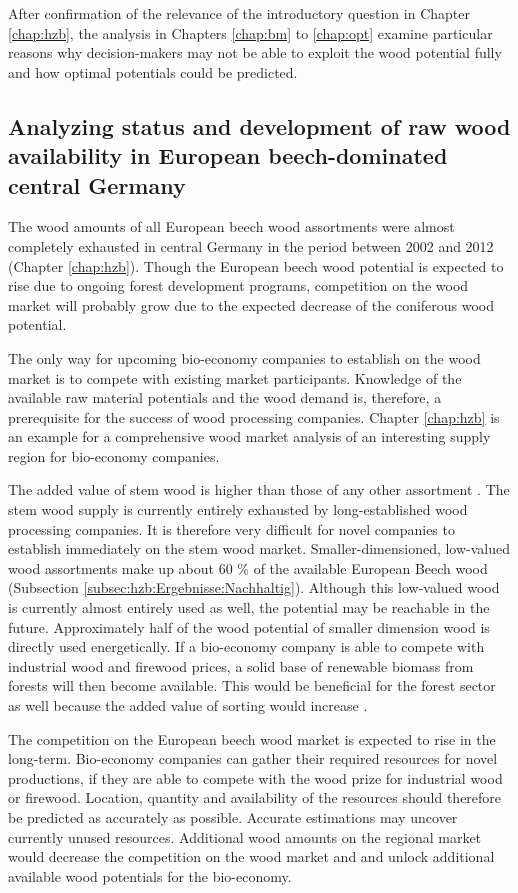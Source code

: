 After confirmation of the relevance of the introductory question in Chapter \ref{chap:hzb}, the analysis in Chapters \ref{chap:bm} to \ref{chap:opt} examine particular reasons why decision-makers may not be able to exploit the wood potential fully and how optimal potentials could be predicted.

\subsection{Analyzing status and development of raw wood availability in European beech-dominated central Germany}
\label{subsec:discussion:struct:hzb}
The wood amounts of all European beech wood assortments were almost completely exhausted in central Germany in the period between 2002 and 2012 (Chapter \ref{chap:hzb}). Though the European beech wood potential is expected to rise due to ongoing forest development programs, competition on the wood market will probably grow due to the expected decrease of the coniferous wood potential.

The only way for upcoming bio-economy companies to establish on the wood market is to compete with existing market participants. Knowledge of the available raw material potentials and the wood demand is, therefore, a prerequisite for the success of wood processing companies. Chapter \ref{chap:hzb} is an example for a comprehensive wood market analysis of an interesting supply region for bio-economy companies.

The added value of stem wood is higher than those of any other assortment \citep{nagel_2008}. The stem wood supply is currently entirely exhausted by long-established wood processing companies. It is therefore very difficult for novel companies to establish immediately on the stem wood market. Smaller-dimensioned, low-valued wood assortments make up about 60 \% of the available European Beech wood (Subsection \ref{subsec:hzb:Ergebnisse:Nachhaltig}). Although this low-valued wood is currently almost entirely used as well, the potential may be reachable in the future. Approximately half of the wood potential of smaller dimension wood is directly used energetically. If a bio-economy company is able to compete with industrial wood and firewood prices, a solid base of renewable biomass from forests will then become available. This would be beneficial for the forest sector as well because the added value of sorting would increase \cite[p. 67]{mohring_1997}.

The competition on the European beech wood market is expected to rise in the long-term. Bio-economy companies can gather their required resources for novel productions, if they are able to compete with the wood prize for industrial wood or firewood. Location, quantity and availability of the resources should therefore be predicted as accurately as possible. Accurate estimations may uncover currently unused resources. Additional wood amounts on the regional market would decrease the competition on the wood market and and unlock additional available wood potentials for the bio-economy.

